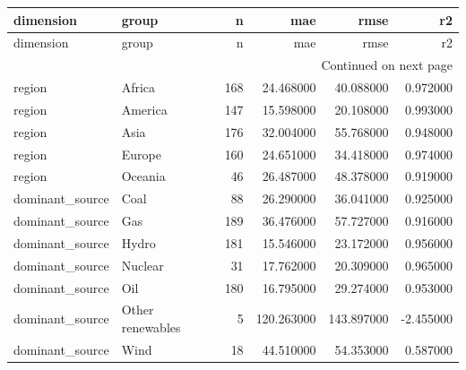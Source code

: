 \begin{longtable}{llrrrr}
\toprule
dimension & group & n & mae & rmse & r2 \\
\midrule
\endfirsthead
\toprule
dimension & group & n & mae & rmse & r2 \\
\midrule
\endhead
\midrule
\multicolumn{6}{r}{Continued on next page} \\
\midrule
\endfoot
\bottomrule
\endlastfoot
region & Africa & 168 & 24.468000 & 40.088000 & 0.972000 \\
region & America & 147 & 15.598000 & 20.108000 & 0.993000 \\
region & Asia & 176 & 32.004000 & 55.768000 & 0.948000 \\
region & Europe & 160 & 24.651000 & 34.418000 & 0.974000 \\
region & Oceania & 46 & 26.487000 & 48.378000 & 0.919000 \\
dominant\_source & Coal & 88 & 26.290000 & 36.041000 & 0.925000 \\
dominant\_source & Gas & 189 & 36.476000 & 57.727000 & 0.916000 \\
dominant\_source & Hydro & 181 & 15.546000 & 23.172000 & 0.956000 \\
dominant\_source & Nuclear & 31 & 17.762000 & 20.309000 & 0.965000 \\
dominant\_source & Oil & 180 & 16.795000 & 29.274000 & 0.953000 \\
dominant\_source & Other renewables & 5 & 120.263000 & 143.897000 & -2.455000 \\
dominant\_source & Wind & 18 & 44.510000 & 54.353000 & 0.587000 \\
\end{longtable}
